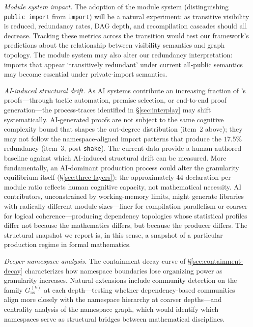 \emph{Module system impact.} The adoption of the module system (distinguishing \texttt{public import} from \texttt{import}) will be a natural experiment: as transitive visibility is reduced, redundancy rates, DAG depth, and recompilation cascades should all decrease. Tracking these metrics across the transition would test our framework's predictions about the relationship between visibility semantics and graph topology. The module system may also alter our redundancy interpretation: imports that appear `transitively redundant' under current all-public semantics may become essential under private-import semantics.

\emph{AI-induced structural drift.} As AI systems contribute an increasing fraction of 's proofs---through tactic automation, premise selection, or end-to-end proof generation---the process-traces identified in \S\ref{sec:interplay} may shift systematically. AI-generated proofs are not subject to the same cognitive complexity bound that shapes the out-degree distribution (item~2 above); they may not follow the namespace-aligned import patterns that produce the $17.5\%$ redundancy (item~3, post-\texttt{shake}). The current data provide a human-authored baseline against which AI-induced structural drift can be measured. More fundamentally, an AI-dominant production process could alter the granularity equilibrium itself (\S\ref{sec:three-layers}): the approximately $44$-declaration-per-module ratio reflects human cognitive capacity, not mathematical necessity. AI contributors, unconstrained by working-memory limits, might generate libraries with radically different module sizes---finer for compilation parallelism or coarser for logical coherence---producing dependency topologies whose statistical profiles differ not because the mathematics differs, but because the producer differs. The structural snapshot we report is, in this sense, a snapshot of a particular production regime in formal mathematics.

\emph{Deeper namespace analysis.} The containment decay curve of \S\ref{sec:containment-decay} characterizes how namespace boundaries lose organizing power as granularity increases. Natural extensions include community detection on the family $G_{\mathrm{ns}}^{(k)}$ at each depth---testing whether dependency-based communities align more closely with the namespace hierarchy at coarser depths---and centrality analysis of the namespace graph, which would identify which namespaces serve as structural bridges between mathematical disciplines.

